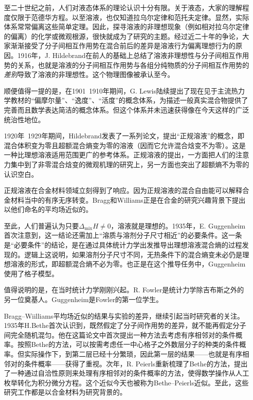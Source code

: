 \documentclass[main.tex]{subfiles}
\begin{document}
至二十世纪之前，人们对液态体系的理论认识十分有限。关于液态，大家的理解程度仅限于范德华方程。以至溶液，也仅知道拉乌尔定律和范托夫定律。显然，实际体系常常偏离这些简单定理。因此，探寻溶液的非理想现象（例如相对拉乌尔定律的偏离）的化学或微观根源，很快就成为了研究的主题\cite{Hildebrand1981}。经过近二十年的争论，大家渐渐接受了分子间相互作用势在混合前后的差异是溶液行为偏离理想行为的原因。1916年，J. Hildebrand在前人的基础上总结了溶液非理想性与分子间相互作用势的关系\cite{Hildebrand1916}，也就是溶液的分子间相互作用势与各组分纯物质的分子间相互作用势的\emph{差别}导致了溶液的非理想性。这个物理图像被承认至今。

顺便值得一提的是，在1901~1910年期间，G. Lewis陆续提出了现在见于主流热力学教材的“偏摩尔量”、“逸度”、“活度”的概念体系\cite{Lewis1901,Lewis1907}，为描述一般真实混合物提供了完善而且数学表达简洁的概念体系。但这个体系并未迅速获得像在今天这样的广泛统治性地位。

1920年~1929年期间，Hildebrand发表了一系列论文，提出“正规溶液”的概念\cite{Hildebrand1951}，即混合体积变为零且超额混合熵变为零的溶液（因而它允许混合焓变不为零）。这是一种比理想溶液适用范围更广的参考体系。正规溶液的提出，一方面把人们的注意力集中到了非零混合焓变的微观机理的研究上，另一方面也突出了超额熵不为零的认识空白。

正规溶液在合金材料领域立刻得到了响应。因为正规溶液的混合自由能可以解释合金材料当中的有序无序转变。Bragg和Williams\cite{Bragg1934,Bragg1935}正是在合金的研究兴趣背景下提出以他们命名的平均场近似的。

至此，人们普遍认为只要$\Delta_\text{mix}H\neq 0$，溶液就是理想的。1935年，E. Guggenheim首次注意到\cite{Guggenheim1935}，这一结论还需加上“溶质与溶剂分子尺寸相近”的必要条件。这一条是“必要条件”的结论，是在通过具体统计力学出发推导出理想溶液混合熵的过程发现的。逻辑上这说明，如果溶剂分子尺寸不同，无热条件下的混合熵变未必仍是理想溶液的形式，即超额混合熵不必为零。也正是在这个推导任务中，Guggenheim使用了格子模型。

值得说明的是，在当时统计力学刚刚兴起。R. Fowler是统计力学除吉布斯之外的另一位奠基人。Guggenheim是Fowler的第一位学生。

Bragg--Wiilliams平均场近似的结果与实验的差异，继续引起当时研究者的关注。1935年H.Bethe首次认识到，既然假定了分子间作用势的差异，就不能再假定分子间完全随机混匀\cite{Bethe1935}。他在这篇论文中首次提出一种方法去考虑有序相邻对的条件概率。按照Bethe的方法，可以按需考虑任一中心格子之外数层分子的种类的条件概率。但实际操作下，到第二层已经十分繁琐，因此第一层的结果——也就是有序相邻对的条件概率——获得了重视。次年，R. Peierls重新梳理了Bethe的方法，提出了一种通过自洽性原则来处理有序相邻对的条件概率的方法\cite{Peierls1936}，使得数学操作从人工枚举转化为积分微分方程。这个近似今天也被称为Bethe--Peierls近似。至此，这些研究工作都是以合金材料为研究背景的。
\end{document}
